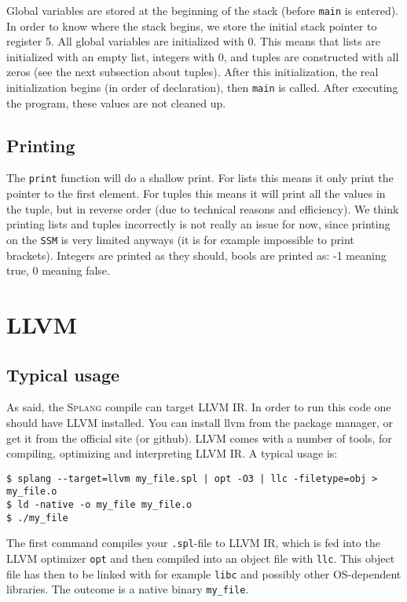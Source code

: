 \documentclass[11pt]{amsart}
\newcommand{\llvm}{\textsc{LLVM}\xspace}
\newcommand{\ssm}{\texttt{SSM}\xspace}
\newcommand{\splang}{\textsc{Splang}\xspace}
\begin{document}
Global variables are stored at the beginning of the stack (before \texttt{main} is entered). In order to know where the stack begins, we store the initial stack pointer to register 5. All global variables are initialized with 0. This means that lists are initialized with an empty list, integers with 0, and tuples are constructed with all zeros (see the next subsection about tuples). After this initialization, the real initialization begins (in order of declaration), then \texttt{main} is called. After executing the program, these values are not cleaned up.

\subsection{Printing}
The \texttt{print} function will do a shallow print. For lists this means it only print the pointer to the first element. For tuples this means it will print all the values in the tuple, but in reverse order (due to technical reasons and efficiency). We think printing lists and tuples incorrectly is not really an issue for now, since printing on the \ssm is very limited anyways (it is for example impossible to print brackets). Integers are printed as they should, bools are printed as: -1 meaning true, 0 meaning false.


\section{\llvm}
\subsection{Typical usage}
As said, the \splang compile can target \llvm IR. In order to run this code one should have \llvm installed. You can install llvm from the package manager, or get it from the official site (or github). \llvm comes with a number of tools, for compiling, optimizing and interpreting \llvm IR. A typical usage is:
\begin{lstlisting}[language=term]
$ splang --target=llvm my_file.spl | opt -O3 | llc -filetype=obj > my_file.o
$ ld -native -o my_file my_file.o
$ ./my_file
\end{lstlisting}
The first command compiles your \texttt{.spl}-file to \llvm IR, which is fed into the \llvm optimizer \texttt{opt} and then compiled into an object file with \texttt{llc}. This object file has then to be linked with for example \texttt{libc} and possibly other OS-dependent libraries. The outcome is a native binary \texttt{my\_file}.
\end{document}
